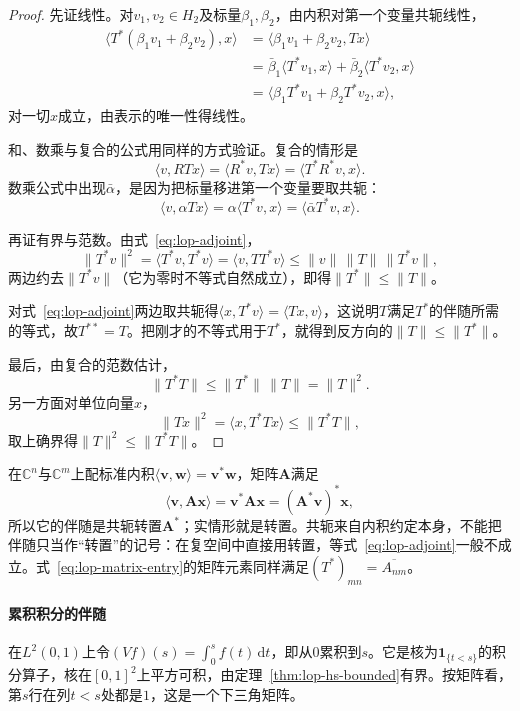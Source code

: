 \begin{proof}
先证线性。对$v_1,v_2\in H_2$及标量$\beta_1,\beta_2$，由内积对第一个变量共轭线性，
\[
 \begin{aligned}
 \langle T^*(\beta_1v_1+\beta_2v_2),x\rangle
 &=\langle\beta_1v_1+\beta_2v_2,Tx\rangle\\
 &=\bar\beta_1\langle T^*v_1,x\rangle+\bar\beta_2\langle T^*v_2,x\rangle\\
 &=\langle\beta_1T^*v_1+\beta_2T^*v_2,x\rangle ,
 \end{aligned}
\]
对一切$x$成立，由表示的唯一性得线性。

和、数乘与复合的公式用同样的方式验证。复合的情形是
\[
 \langle v,RTx\rangle=\langle R^*v,Tx\rangle=\langle T^*R^*v,x\rangle.
\]
数乘公式中出现$\bar\alpha$，是因为把标量移进第一个变量要取共轭：
\[
 \langle v,\alpha Tx\rangle=\alpha\langle T^*v,x\rangle=\langle\bar\alpha T^*v,x\rangle.
\]

再证有界与范数。由式~\eqref{eq:lop-adjoint}，
\[
 \lVert T^*v\rVert^2=\langle T^*v,T^*v\rangle=\langle v,TT^*v\rangle\leq\lVert v\rVert\,\lVert T\rVert\,\lVert T^*v\rVert,
\]
两边约去$\lVert T^*v\rVert$（它为零时不等式自然成立），即得$\lVert T^*\rVert\leq\lVert T\rVert$。

对式~\eqref{eq:lop-adjoint}两边取共轭得$\langle x,T^*v\rangle=\langle Tx,v\rangle$，这说明$T$满足$T^*$的伴随所需的等式，故$T^{**}=T$。把刚才的不等式用于$T^*$，就得到反方向的$\lVert T\rVert\leq\lVert T^*\rVert$。

最后，由复合的范数估计，
\[
 \lVert T^*T\rVert\leq\lVert T^*\rVert\,\lVert T\rVert=\lVert T\rVert^2.
\]
另一方面对单位向量$x$，
\[
 \lVert Tx\rVert^2=\langle x,T^*Tx\rangle\leq\lVert T^*T\rVert,
\]
取上确界得$\lVert T\rVert^2\leq\lVert T^*T\rVert$。
\end{proof}

在$\mathbb C^n$与$\mathbb C^m$上配标准内积$\langle\bm v,\bm w\rangle=\bm v^*\bm w$，矩阵$\bm A$满足
\[
 \langle\bm v,\bm A\bm x\rangle=\bm v^*\bm A\bm x=(\bm A^*\bm v)^*\bm x,
\]
所以它的伴随是共轭转置$\bm A^*$；实情形就是转置。共轭来自内积约定本身，不能把伴随只当作“转置”的记号：在复空间中直接用转置，等式~\eqref{eq:lop-adjoint}一般不成立。式~\eqref{eq:lop-matrix-entry}的矩阵元素同样满足$(T^*)_{mn}=\overline{A_{nm}}$。

\paragraph{累积积分的伴随}
在$L^2(0,1)$上令$(Vf)(s)=\int_0^sf(t)\,\mathrm dt$，即从$0$累积到$s$。它是核为$\mathbf 1_{\{t<s\}}$的积分算子，核在$[0,1]^2$上平方可积，由定理~\ref{thm:lop-hs-bounded}有界。按矩阵看，第$s$行在列$t<s$处都是$1$，这是一个下三角矩阵。

